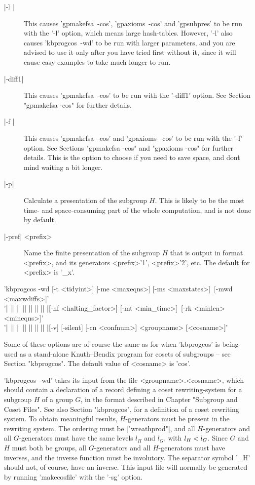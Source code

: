 \begin{description}
\item[|-l |]
This causes 'gpmakefsa\ -cos', 'gpaxioms\ -cos' and 'gpsubpres' to be run with
the '-l' option, which means large hash-tables.
However, '-l' also causes 'kbprogcos\ -wd' to be run
with larger parameters, and you are advised to use it only after you
have tried first without it, since it will cause easy examples to take
much longer to run.
\item[|-diff1|]
This causes 'gpmakefsa\ -cos' to be run with the '-diff1' option. See Section
"gpmakefsa -cos" for further details.
\item[|-f |] This causes 'gpmakefsa\ -cos' and 'gpaxioms\ -cos' to be run with
the '-f' option. See Sections "gpmakefsa -cos" and "gpaxioms -cos" for
further details. This is the option to choose if you need to save space,
and don\'t mind waiting a bit longer.
\item[|-p|] Calculate a presentation of the subgroup $H$. This is likely to be
the most time- and space-consuming part of the whole computation, and is not
done by default.
\item[|-pref| <prefix>] Name the finite presentation of the subgroup
$H$ that is output in {\GAP} format <prefix>, and its generators
<prefix>'1', <prefix>'2', etc. The default for <prefix> is '\_x'. 
\end{description}
'kbprogcos -wd [-t <tidyint>] [-me <maxeqns>] [-ms <maxstates>]\
[-mwd <maxwdiffs>]'\\
'| || || || || || || |[-hf <halting\_factor>] [-mt <min\_time>]\
[-rk <minlen> <mineqns>]'\\
'| || || || || || || |[-v] [-silent] [-cn <confnum>] <groupname> [<cosname>]'

Some of these options are of course the same as for when 'kbprogcos' is being
used as a stand-alone Knuth--Bendix program for cosets of subgroups --
see Section "kbprogcos". The default value of <cosname> is 'cos'.

'kbprogcos\ -wd' takes its input from the file <groupname>.<cosname>,
which should contain a declaration of a record defining a coset
rewriting-system for a subgroup $H$ of a group $G$, in the format described in
Chapter "Subgroup and Coset Files". See also Section "kbprogcos", for a
definition of a coset rewriting system. To obtain meaningful results,
$H$-generators must be present in the rewriting system.
The ordering must be |"wreathprod"|, and all $H$-generators  and all
$G$-generators must have the same levels $l_H$ and $l_G$, with $l_H \< l_G$.
Since $G$ and $H$ must both be groups, all $G$-generators and all
$H$-generators must have inverses, and the inverse function must be involutory.
The separator symbol '\_H' should not, of course, have an inverse.
This input file will normally be generated by running 'makecosfile' with the
'-sg' option.

